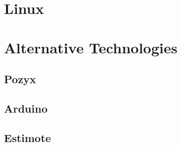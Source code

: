\documentclass[../Main/thesis.tex]{subfiles}
\begin{document}
\section{Linux}


\section{Alternative Technologies}
\subsection{Pozyx}
\subsection{Arduino}
\subsection{Estimote}



\onlyinsubfile{}
\onlyinsubfile{}
\end{document}
